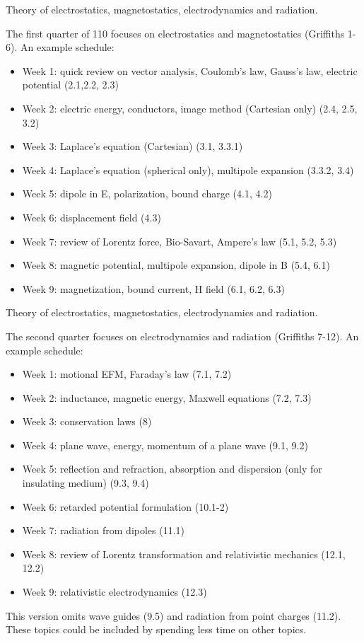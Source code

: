 \documentclass[12pt]{article}
\begin{document}
\newpage

\vskip 1cm
Theory of electrostatics, magnetostatics, electrodynamics and radiation.

The first quarter of 110 focuses on electrostatics and magnetostatics
(Griffiths 1-6).  An example schedule:
\begin{itemize}
\item Week 1: quick review on vector analysis, Coulomb's law, Gauss's law, electric potential (2.1,2.2, 2.3)
\item Week 2: electric energy, conductors, image method (Cartesian only) (2.4, 2.5, 3.2)
\item Week 3: Laplace's equation (Cartesian) (3.1, 3.3.1)
\item Week 4: Laplace's equation (spherical only), multipole expansion (3.3.2, 3.4)
\item Week 5: dipole in E, polarization, bound charge (4.1, 4.2)
\item Week 6: displacement field (4.3)
\item Week 7: review of Lorentz force, Bio-Savart, Ampere's law (5.1, 5.2, 5.3)
\item Week 8: magnetic potential, multipole expansion, dipole in B (5.4, 6.1)
\item Week 9: magnetization, bound current, H field (6.1, 6.2, 6.3)
\end{itemize}

Theory of electrostatics, magnetostatics, electrodynamics and radiation.

The second quarter focuses on electrodynamics and radiation (Griffiths 7-12).
An example schedule:
\begin{itemize}
\item Week 1: motional EFM, Faraday's law (7.1, 7.2)
\item Week 2: inductance, magnetic energy, Maxwell equations (7.2, 7.3)
\item Week 3: conservation laws (8)
\item Week 4: plane wave, energy, momentum of a plane wave (9.1, 9.2)
\item Week 5: reflection and refraction, absorption and dispersion (only for insulating medium) (9.3, 9.4)
\item Week 6: retarded potential formulation (10.1-2)
\item Week 7: radiation from dipoles (11.1)
\item Week 8: review of Lorentz transformation and relativistic mechanics (12.1, 12.2)
\item Week 9: relativistic electrodynamics (12.3)
\end{itemize}
This version omits wave guides (9.5) and radiation from point charges
(11.2).  These topics could be included by spending less time on other
topics.
\newpage
\end{document}
